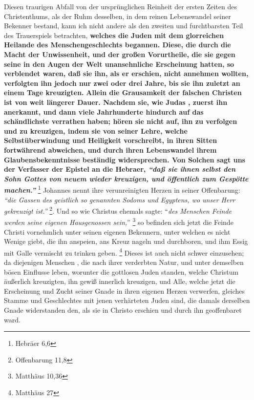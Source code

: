 Diesen traurigen Abfall von der ursprünglichen Reinheit der ersten Zeiten des
Christenthums, als der Ruhm desselben, in dem reinen Lebenswandel seiner
Bekenner bestand, kann ich nicht andere als den zweiten und furchtbarsten Teil
des Trauerspiels betrachten, \textbf{welches die Juden  mit dem
glorreichen Heilande des Menschengeschlechts begannen. Diese, die durch die
Macht der Unwissenheit, und der großen Vorurtheile, die sie gegen seine in den
Augen der Welt unansehnliche Erscheinung hatten, so verblendet waren, daß sie
ihn, als er erschien, nicht annehmen wollten, verfolgten ihn jedoch nur zwei
oder drei Jahre, bis sie ihn zuletzt an einem Tage kreuzigten.}
\textbf{Allein die Grausamkeit der falschen Christen ist von weit längerer
Dauer. Nachdem sie, wie Judas , zuerst ihn anerkannt, und
dann viele Jahrhunderte hindurch auf das schändlichste verrathen haben; hören
sie nicht auf, ihn zu verfolgen und zu kreuzigen, indem sie von seiner Lehre,
welche Selbstüberwindung und Heiligkeit vorschreibt, in ihren Sitten fortwährend
abweichen, und durch ihren Lebenswandel ihrem Glaubensbekenntnisse beständig
widersprechen. Von Solchen sagt uns der Verfasser der Epistel an die Hebraer,
\textit{"`daß sie ihnen selbst den Sohn Gottes von neuem wieder kreuzigen, und
öffentlich zum Gespötte machen."'}}
\footnote{Hebräer 6,6}
Johannes nennt ihre verunreinigten Herzen in seiner Offenbarung:
\textit{"`die Gassen des geistlich so genannten Sodoms und Egyptens, wo unser Herr gekreuzigt ist."'}
\footnote{Offenbarung 11,8}.
Und so wie Christus ehemals sagte: "`\textit{des
Menschen Feinde werden seine eigenen Hausgenossen sein,}"'
\footnote{Matthäus 10,36}
so befinden sich jetzt die Feinde Christi vornehmlich unter seinen
eigenen Bekennern, unter welchen es nicht Wenige giebt, die ihn anspeien, ans
Kreuz nageln und durchboren, und ihm Essig mit Galle vermischt zu trinken
geben.
\footnote{Matthäus 27}
Dieses ist auch nicht schwer einzusehen; da
diejenigen Menschen , die nach ihrer verderbten Natur, und unter demselben bösen
Einflusse leben, worunter die gottlosen Juden standen, welche Christum äußerlich
kreuzigten, ihn gewiß innerlich kreuzigen, und Alle, welche jetzt die
Erscheinung und Zucht seiner Gnade in ihren eigenen Herzen verwerfen, gleiches
Stamme und Geschlechtes mit jenen verhärteten Juden sind, die damals derselben
Gnade widerstanden den, als sie in Christo erschien und durch ihn geoffenbaret
ward.

